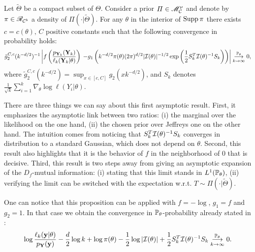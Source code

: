 \begin{prop}\label{prop:PSGSA:cvptheta}
    Let $\tilde\Theta$ be a compact subset of $\Theta$.
    Consider a prior $\varPi\in\sM^\nu_\cC$ and denote by $\pi\in\sR_{\cC^b}$ a density of $\varPi(\cdot|\tilde\Theta)$.%
    For any $\theta$ in the interior of $\Supp\pi$ there exists $c=c(\theta),\,C$ positive constants such that the following convergence in probability holds:
    \begin{equation}
        \label{eq:cvinproba}
        \tilde g_2^{C,c}(k^{-d/2})^{-1}\left| f\left(\frac{p_{\mbf Y_k}(\mbf Y_k)}{\ell_k(\mbf Y_k|\theta)}\right) \right.            \left. - g_1\left(k^{-d/2}\pi(\theta)(2\pi)^{d/2}|\cI(\theta)|^{-1/2}\exp\left(\frac{1}{2}S_k^T\cI(\theta)^{-1}S_k \right)\right) \right| %
                \conv[\PP_{\theta}]{k\rightarrow\infty} 0,
    \end{equation}
    where $\tilde g_2^{C,c}(k^{-d/2})=\sup_{x\in[c,C]} g_2(xk^{-d/2})$, and $S_k$ denotes $\frac{1}{\sqrt{k}}\sum_{i=1}^k\nabla_\theta\log\ell(Y_i|\theta)$.
\end{prop}


There are three things we can say about this first asymptotic result. %
First, it emphasizes the asymptotic link {between two ratios: (i) the marginal over the likelihood on the one hand, (ii) the chosen prior over Jeffreys one on the other hand.}  
The intuition comes from noticing that $S_k^T\cI(\theta)^{-1}S_k$ converges in distribution to a standard Gaussian, which does not depend on $\theta$.
Second, 
this result also highlights that it is the behavior of $f$ in the neighborhood of $0$ that is decisive.
Third, this result is two steps away from giving an asymptotic expansion of the $D_f$-mutual information: (i) stating that this limit stands in $L^1(\PP_{\theta})$, (ii) verifying the limit can be switched with the expectation w.r.t. $T\sim\varPi(\cdot|\tilde\Theta)$.




One can notice that this proposition can be applied with $f=-\log$, $g_1=f$ and $g_2=1$. 
In that case we obtain the convergence in $\PP_\theta$-probability already stated in \cite{clarke_information-theoretic_1990}:
    \begin{equation}
        \log\frac{\ell_k(\mbf y|\theta)}{p_{\mbf Y}(\mbf y)} - \frac{d}{2}\log k + \log\pi(\theta) - \frac{1}{2}\log|\cI(\theta)| +\frac{1}{2}S_k^T\cI(\theta)^{-1}S_k  \conv[\PP_\theta]{k\rightarrow\infty} 0.
    \end{equation}







